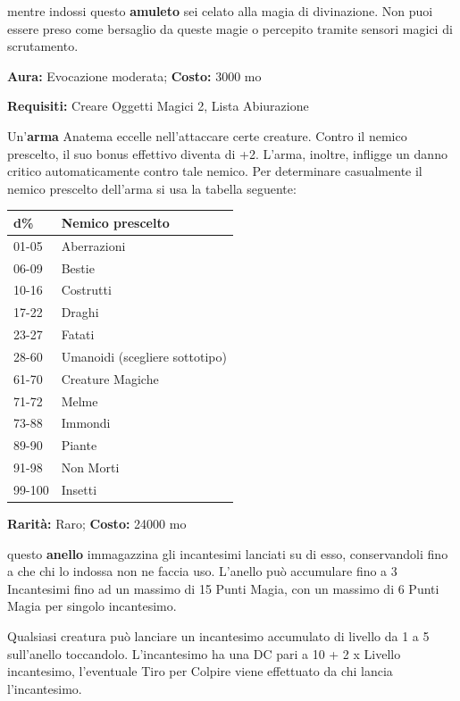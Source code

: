 \begin{multicols}{2}
mentre indossi questo \textbf{amuleto} sei celato alla magia di divinazione. Non puoi essere preso come bersaglio da queste magie o percepito tramite sensori magici di scrutamento.


\textbf{Aura:} Evocazione moderata; \textbf{Costo:} 3000 mo

\textbf{Requisiti:} Creare Oggetti Magici 2, Lista Abiurazione

Un'\textbf{arma} Anatema eccelle nell'attaccare certe creature. Contro il nemico prescelto, il suo bonus effettivo diventa di +2. L'arma, inoltre, infligge un danno critico automaticamente contro tale nemico. Per determinare casualmente il nemico prescelto dell'arma si usa la tabella seguente:

\medskip

\noindent\begin{tabularx}{\linewidth}{ll}
	\toprule
\rowcolor{gray!20}d\% &Nemico prescelto\\
\toprule
01-05 &Aberrazioni\\
\rowcolor{gray!20}06-09 &Bestie\\
10-16 &Costrutti\\
\rowcolor{gray!20}17-22 &Draghi\\
23-27 &Fatati\\
\rowcolor{gray!20}28-60 &Umanoidi (scegliere sottotipo)\\
61-70 &Creature Magiche\\
\rowcolor{gray!20}71-72 &Melme\\
73-88 &Immondi\\
\rowcolor{gray!20}89-90 &Piante\\
91-98 &Non Morti\\
\rowcolor{gray!20}99-100 &Insetti
\end{tabularx}

\medskip


\textbf{Rarità:} Raro; \textbf{Costo:} 24000 mo

questo \textbf{anello} immagazzina gli incantesimi lanciati su di esso, conservandoli fino a che chi lo indossa non ne faccia uso. L'anello può accumulare fino a 3 Incantesimi fino ad un massimo di 15 Punti Magia, con un massimo di 6 Punti Magia per singolo incantesimo.

Qualsiasi creatura può lanciare un incantesimo accumulato di livello da 1 a 5 sull'anello toccandolo. L'incantesimo ha una DC pari a 10 + 2 x Livello incantesimo, l'eventuale Tiro per Colpire viene effettuato da chi lancia l'incantesimo.


\end{multicols}
